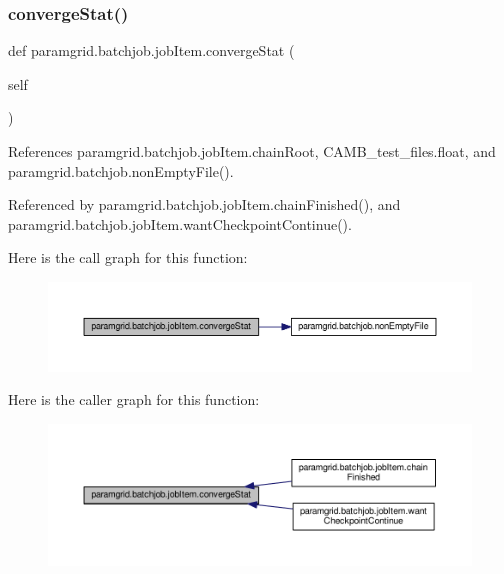 \subsubsection{\texorpdfstring{converge\+Stat()}{convergeStat()}}
{\footnotesize\ttfamily def paramgrid.\+batchjob.\+job\+Item.\+converge\+Stat (\begin{DoxyParamCaption}\item[{}]{self }\end{DoxyParamCaption})}



References paramgrid.\+batchjob.\+job\+Item.\+chain\+Root, C\+A\+M\+B\+\_\+test\+\_\+files.\+float, and paramgrid.\+batchjob.\+non\+Empty\+File().



Referenced by paramgrid.\+batchjob.\+job\+Item.\+chain\+Finished(), and paramgrid.\+batchjob.\+job\+Item.\+want\+Checkpoint\+Continue().

Here is the call graph for this function\+:
\nopagebreak
\begin{figure}[H]
\begin{center}
\leavevmode
\includegraphics[width=350pt]{classparamgrid_1_1batchjob_1_1jobItem_afbcba65e1aeaf86c50b6e8804ce0932d_cgraph}
\end{center}
\end{figure}
Here is the caller graph for this function\+:
\nopagebreak
\begin{figure}[H]
\begin{center}
\leavevmode
\includegraphics[width=350pt]{classparamgrid_1_1batchjob_1_1jobItem_afbcba65e1aeaf86c50b6e8804ce0932d_icgraph}
\end{center}
\end{figure}
\mbox{\label{classparamgrid_1_1batchjob_1_1jobItem_aaee158d49404d612429bb2b9fbc9f5cf}} 
